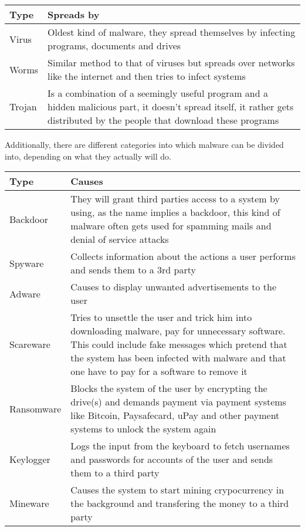 \documentclass[a4paper,10pt]{article}
\begin{document}
\begin{center}
\begin{tabularx}{\textwidth}{l|X}
Type & Spreads by\\
\hline
Virus & Oldest kind of malware, they spread themselves by infecting programs, documents and drives\\
 \hline
Worms & Similar method to that of viruses but spreads over networks like the internet and then tries to infect systems\\
 \hline
Trojan & Is a combination of a seemingly useful program and a hidden malicious part, it doesn't spread itself, it rather gets distributed by the people that download these programs\\
\end{tabularx}
\end{center}

Additionally, there are different categories into which malware can be divided into, depending on what they actually will do.

\begin{center}
\begin{tabularx}{\textwidth}{l|X}
Type & Causes\\
\hline
Backdoor & They will grant third parties access to a system by using, as the name implies a backdoor, this kind of malware often gets used for spamming mails and denial of service attacks\\
\hline
Spyware & Collects information about the actions a user performs and sends them to a 3rd party\\
\hline
Adware & Causes to display unwanted advertisements to the user\\
\hline
Scareware & Tries to unsettle the user and trick him into downloading malware, pay for unnecessary software. This could include fake messages which pretend that the system has been infected with malware and that one have to pay for a software to remove it\\
\hline
Ransomware & Blocks the system of the user by encrypting the drive(s) and demands payment via payment systems like Bitcoin, Paysafecard, uPay and other payment systems to unlock the system again\\
\hline
Keylogger & Logs the input from the keyboard to fetch usernames and passwords for accounts of the user and sends them to a third party\\
\hline
Mineware & Causes the system to start mining crypocurrency in the background and transfering the money to a third party\\
\end{tabularx}
\end{center}
\end{document}
